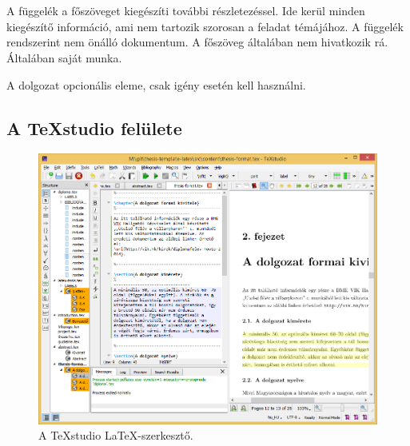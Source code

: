 \appendix
\chapter*{\fuggelek}
\setcounter{chapter}{\appendixletter} %


A függelék a főszöveget kiegészíti további részletezéssel. Ide kerül minden kiegészítő információ, ami nem tartozik szorosan a feladat témájához. A függelék rendszerint nem önálló dokumentum. A főszöveg általában nem hivatkozik rá. Általában saját munka.

A dolgozat opcionális eleme, csak igény esetén kell használni.

\section{A TeXstudio felülete}
\begin{figure}[!ht]
\centering
\includegraphics[width=150mm, keepaspectratio]{figures/TeXstudio.png}
\caption{A TeXstudio \LaTeX-szerkesztő.} 
\end{figure}

